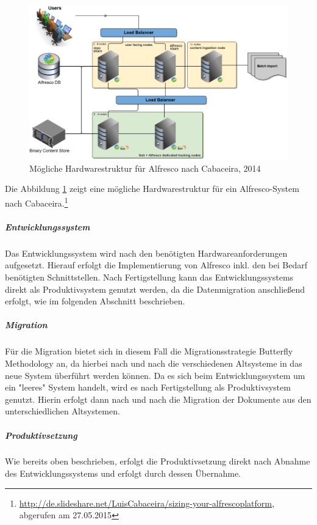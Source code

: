 \begin{figure}[h!]
	\centering
	\includegraphics[width=\textwidth]
	{kapitel/gruppe4_1/bilder/deployment_diagramm_alfresco}
	\caption{Mögliche Hardwarestruktur für Alfresco nach Cabaceira, 2014}
	\label{fig_deployment_alfresco}
\end{figure}

Die Abbildung \ref{fig_deployment_alfresco} zeigt eine mögliche Hardwarestruktur für ein Alfresco-System nach Cabaceira.\footnote{\url{http://de.slideshare.net/LuisCabaceira/sizing-your-alfrescoplatform}, abgerufen am 27.05.2015}

\subparagraph{Entwicklungssystem}
Das Entwicklungssystem wird nach den benötigten Hardwareanforderungen aufgesetzt. Hierauf erfolgt die Implementierung von Alfresco inkl. den bei Bedarf benötigten Schnittstellen. Nach Fertigstellung kann das Entwicklungssystems direkt als Produktivsystem genutzt werden, da die Datenmigration anschließend erfolgt, wie im folgenden Abschnitt beschrieben.

\subparagraph{Migration}
Für die Migration bietet sich in diesem Fall die Migrationsstrategie Butterfly Methodology an, da hierbei nach und nach die verschiedenen Altsysteme in das neue System überführt werden können. Da es sich beim Entwicklungssystem um ein "leeres" System handelt, wird es nach Fertigstellung als Produktivsystem genutzt. Hierin erfolgt dann nach und nach die Migration der Dokumente aus den unterschiedlichen Altsystemen.

\subparagraph{Produktivsetzung}
Wie bereits oben beschrieben, erfolgt die Produktivsetzung direkt nach Abnahme des Entwicklungssystems und erfolgt durch dessen Übernahme.

